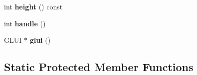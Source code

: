 \begin{DoxyCompactItemize}
\item 
\hypertarget{classBaseGfxApp_aa253dbe16a20c40e0a1bf8ff942ceea3}{int {\bfseries height} () const }\label{classBaseGfxApp_aa253dbe16a20c40e0a1bf8ff942ceea3}

\item 
\hypertarget{classBaseGfxApp_ae9779f948eff6f45beec08091e98a803}{int {\bfseries handle} ()}\label{classBaseGfxApp_ae9779f948eff6f45beec08091e98a803}

\item 
\hypertarget{classBaseGfxApp_ac721a0fedce80308c5c0e5695016e95d}{G\-L\-U\-I $\ast$ {\bfseries glui} ()}\label{classBaseGfxApp_ac721a0fedce80308c5c0e5695016e95d}

\end{DoxyCompactItemize}
\subsection*{Static Protected Member Functions}
